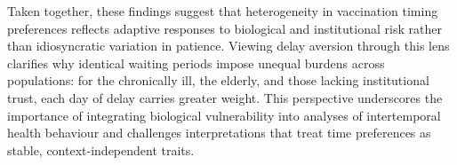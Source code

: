 Taken together, these findings suggest that heterogeneity in vaccination timing preferences reflects adaptive responses to biological and institutional risk rather than idiosyncratic variation in patience. Viewing delay aversion through this lens clarifies why identical waiting periods impose unequal burdens across populations: for the chronically ill, the elderly, and those lacking institutional trust, each day of delay carries greater weight. This perspective underscores the importance of integrating biological vulnerability into analyses of intertemporal health behaviour and challenges interpretations that treat time preferences as stable, context-independent traits.
